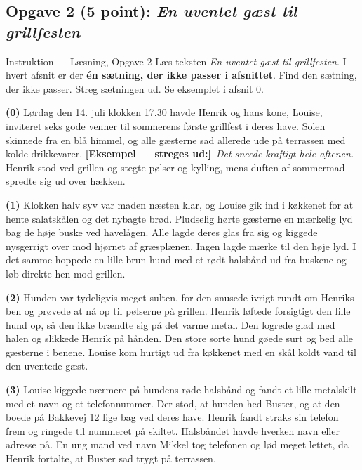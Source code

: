 \subsection*{Opgave 2 (5 point): \textit{En uventet gæst til grillfesten}}

\begin{grammatikbox}{Instruktion — Læsning, Opgave 2}
\small
Læs teksten \textit{En uventet gæst til grillfesten}. I hvert afsnit er der \textbf{én sætning, der ikke passer i afsnittet}. Find den sætning, der ikke passer. Streg sætningen ud. Se eksemplet i afsnit 0.
\end{grammatikbox}

\textbf{(0)} Lørdag den 14. juli klokken 17.30 havde Henrik og hans kone, Louise, inviteret seks gode venner til sommerens første grillfest i deres have. Solen skinnede fra en blå himmel, og alle gæsterne sad allerede ude på terrassen med kolde drikkevarer. \textcolor{NCDRed}{\textbf{[Eksempel — streges ud:]}}\ \textit{Det sneede kraftigt hele aftenen.} Henrik stod ved grillen og stegte pølser og kylling, mens duften af sommermad spredte sig ud over hækken.

\textbf{(1)} Klokken halv syv var maden næsten klar, og Louise gik ind i køkkenet for at hente salatskålen og det nybagte brød. Pludselig hørte gæsterne en mærkelig lyd bag de høje buske ved havelågen. Alle lagde deres glas fra sig og kiggede nysgerrigt over mod hjørnet af græsplænen. Ingen lagde mærke til den høje lyd. I det samme hoppede en lille brun hund med et rødt halsbånd ud fra buskene og løb direkte hen mod grillen.

\textbf{(2)} Hunden var tydeligvis meget sulten, for den snusede ivrigt rundt om Henriks ben og prøvede at nå op til pølserne på grillen. Henrik løftede forsigtigt den lille hund op, så den ikke brændte sig på det varme metal. Den logrede glad med halen og slikkede Henrik på hånden. Den store sorte hund gøede surt og bed alle gæsterne i benene. Louise kom hurtigt ud fra køkkenet med en skål koldt vand til den uventede gæst.

\textbf{(3)} Louise kiggede nærmere på hundens røde halsbånd og fandt et lille metalskilt med et navn og et telefonnummer. Der stod, at hunden hed Buster, og at den boede på Bakkevej 12 lige bag ved deres have. Henrik fandt straks sin telefon frem og ringede til nummeret på skiltet. Halsbåndet havde hverken navn eller adresse på. En ung mand ved navn Mikkel tog telefonen og lød meget lettet, da Henrik fortalte, at Buster sad trygt på terrassen.

